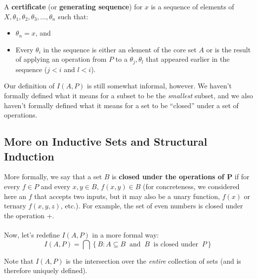 \documentclass[]{article}
\theoremstyle{definition}
\newcommand{\lecture}[1]{\marginpar{{\footnotesize $\leftarrow$ \underline{#1}}}}
\begin{document}
\begin{enumerate}
          A \textbf{certificate} (or \textbf{generating sequence}) for $x$ is a sequence of elements of $X, \theta_1, \theta_2, \theta_3, \ldots, \theta_n$ such that:
          \begin{itemize}
            \item $\theta_n = x$, and
            \item Every $\theta_i$ in the sequence is either an element of the core set $A$ or is the result of applying an operation from $P$ to a $\theta_j, \theta_l$ that appeared earlier in the sequence ($j < i$ and $l < i$). \lecture{September 12, 2013}
          \end{itemize}
        \end{enumerate}

        Our definition of $I(A, P)$ is still somewhat informal, however. We haven't formally defined what it means for a subset to be the \emph{smallest} subset, and we also haven't formally defined what it means for a set to be ``closed'' under a set of operations.

        \subsection{More on Inductive Sets and Structural Induction}
        More formally, we say that a set $B$ is \textbf{closed under the operations of $\boldsymbol P$} if for every $f \in P$ and every $x, y \in B$, $f(x, y) \in B$ (for concreteness, we considered here an $f$ that accepts two inputs, but it may also be a unary function, $f(x)$ or ternary $f(x,y, z)$, etc.). For example, the set of even numbers is closed under the operation +.
        \\ \\
        Now, let's redefine $I(A, P)$ in a more formal way:
        $$
          I(A, P) = \bigcap \left\{ B : A \subseteq B ~\text{ and } ~B ~\text{ is closed under } ~P \right\}
        $$

        Note that $I(A, P)$ is the intersection over the \emph{entire} collection of sets (and is therefore uniquely defined).
\end{document}
